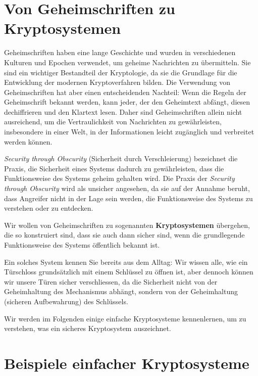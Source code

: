 \section{Von Geheimschriften zu Kryptosystemen}
Geheimschriften haben eine lange Geschichte und wurden in verschiedenen Kulturen und Epochen verwendet, um geheime Nachrichten zu übermitteln. Sie sind ein wichtiger Bestandteil der Kryptologie, da sie die Grundlage für die Entwicklung der modernen Kryptoverfahren bilden.
Die Verwendung von Geheimschriften hat aber einen entscheidenden Nachteil: Wenn die Regeln der Geheimschrift bekannt werden, kann jeder, der den Geheimtext abfängt, diesen dechiffrieren und den Klartext lesen. Daher sind Geheimschriften allein nicht ausreichend, um die Vertraulichkeit von Nachrichten zu gewährleisten, insbesondere in einer Welt, in der Informationen leicht zugänglich und verbreitet werden können.

\begin{myremark}\label{myremark:security_through_obscurity}
	\emph{Security through Obscurity} (Sicherheit durch Verschleierung) bezeichnet die Praxis, die Sicherheit eines Systems dadurch zu gewährleisten, dass die Funktionsweise des Systems geheim gehalten wird.
	Die Praxis der \emph{Security through Obscurity} wird als unsicher angesehen, da sie auf der Annahme beruht, dass Angreifer nicht in der Lage sein werden, die Funktionsweise des Systems zu verstehen oder zu entdecken.
\end{myremark}

\begin{myidea}[Kryptosystem]
	Wir wollen von Geheimschriften zu sogenannten \textbf{Kryptosystemen} übergehen, die so konstruiert sind, dass sie auch dann sicher sind, wenn die grundlegende Funktionsweise des Systems öffentlich bekannt ist.
	\par
	Ein solches System kennen Sie bereits aus dem Alltag: Wir wissen alle, wie ein Türschloss grundsätzlich mit einem Schlüssel zu öffnen ist, aber dennoch können wir unsere Türen sicher verschliessen, da die Sicherheit nicht von der Geheimhaltung des Mechanismus abhängt, sondern von der Geheimhaltung (sicheren Aufbewahrung) des Schlüssels.
\end{myidea}

Wir werden im Folgenden einige einfache Kryptosysteme kennenlernen, um zu verstehen, was ein sicheres Kryptosystem auszeichnet.

\section{Beispiele einfacher Kryptosysteme}

